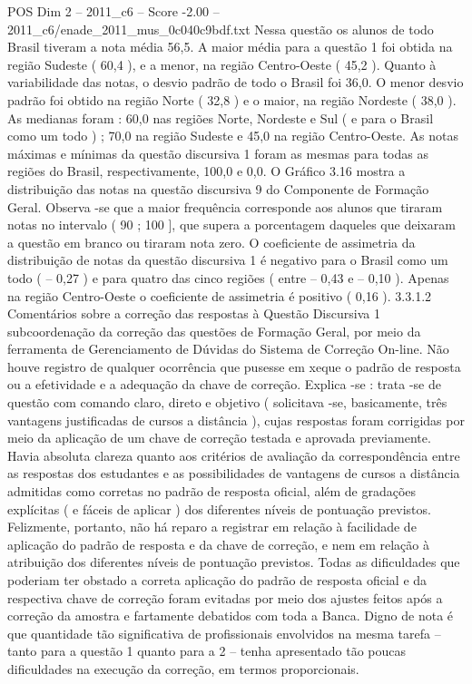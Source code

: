 \begin{textsample}{POS Dim 2 – 2011\_c6 – Score -2.00 – 2011\_c6/enade\_2011\_mus\_0c040c9bdf.txt}
Nessa questão os alunos de todo Brasil tiveram a nota média 56,5.
A maior média para a questão 1 foi obtida na região Sudeste ( 60,4 ), e a menor, na região Centro-Oeste ( 45,2 ).
Quanto à variabilidade das notas, o desvio padrão de todo o Brasil foi 36,0.
O menor desvio padrão foi obtido na região Norte ( 32,8 ) e o maior, na região Nordeste ( 38,0 ).
As medianas foram : 60,0 nas regiões Norte, Nordeste e Sul ( e para o Brasil como um todo ) ; 70,0 na região Sudeste e 45,0 na região Centro-Oeste.
As notas máximas e mínimas da questão discursiva 1 foram as mesmas para todas as regiões do Brasil, respectivamente, 100,0 e 0,0.
O Gráfico 3.16 mostra a distribuição das notas na questão discursiva 9 do Componente de Formação Geral.
Observa -se que a maior frequência corresponde aos alunos que tiraram notas no intervalo ( 90 ; 100 ], que supera a porcentagem daqueles que deixaram a questão em branco ou tiraram nota zero.
O coeficiente de assimetria da distribuição de notas da questão discursiva 1 é negativo para o Brasil como um todo ( – 0,27 ) e para quatro das cinco regiões ( entre – 0,43 e – 0,10 ).
Apenas na região Centro-Oeste o coeficiente de assimetria é positivo ( 0,16 ). 3.3.1.2 Comentários sobre a correção das respostas à Questão Discursiva 1 subcoordenação da correção das questões de Formação Geral, por meio da ferramenta de Gerenciamento de Dúvidas do Sistema de Correção On-line.
Não houve registro de qualquer ocorrência que pusesse em xeque o padrão de resposta ou a efetividade e a adequação da chave de correção.
Explica -se : trata -se de questão com comando claro, direto e objetivo ( solicitava -se, basicamente, três vantagens justificadas de cursos a distância ), cujas respostas foram corrigidas por meio da aplicação de um chave de correção testada e aprovada previamente.
Havia absoluta clareza quanto aos critérios de avaliação da correspondência entre as respostas dos estudantes e as possibilidades de vantagens de cursos a distância admitidas como corretas no padrão de resposta oficial, além de gradações explícitas ( e fáceis de aplicar ) dos diferentes níveis de pontuação previstos.
Felizmente, portanto, não há reparo a registrar em relação à facilidade de aplicação do padrão de resposta e da chave de correção, e nem em relação à atribuição dos diferentes níveis de pontuação previstos.
Todas as dificuldades que poderiam ter obstado a correta aplicação do padrão de resposta oficial e da respectiva chave de correção foram evitadas por meio dos ajustes feitos após a correção da amostra e fartamente debatidos com toda a Banca.
Digno de nota é que quantidade tão significativa de profissionais envolvidos na mesma tarefa – tanto para a questão 1 quanto para a 2 – tenha apresentado tão poucas dificuldades na execução da correção, em termos proporcionais.

\end{textsample}
